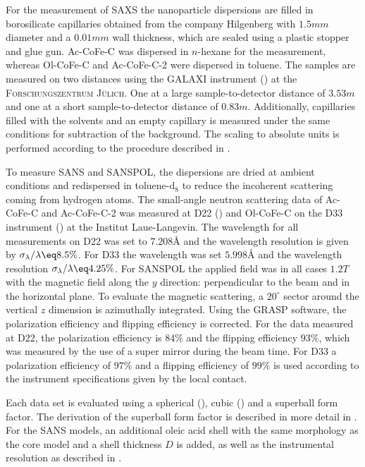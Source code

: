 \documentclass[\main/dresen_thesis.tex]{subfiles}
\begin{document}
    For the measurement of SAXS the nanoparticle dispersions are filled in borosilicate capillaries obtained from the company Hilgenberg with $1.5 \unit{mm}$ diameter and a $0.01 \unit{mm}$ wall thickness, which are sealed using a plastic stopper and glue gun.
    Ac-CoFe-C was dispersed in $\mathit{n}$-hexane for the measurement, whereas Ol-CoFe-C and Ac-CoFe-C-2 were dispersed in toluene.
    The samples are measured on two distances using the GALAXI instrument () at the \textsc{Forschungszentrum J\"ulich}.
    One at a large sample-to-detector distance of $3.53 \unit{m}$ and one at a short sample-to-detector distance of $0.83 \unit{m}$.
    Additionally, capillaries filled with the solvents and an empty capillary is measured under the same conditions for subtraction of the background.
    The scaling to absolute units is performed according to the procedure described in .

    To measure SANS and SANSPOL, the dispersions are dried at ambient conditions and redispersed in toluene-$\mathrm{d_8}$ to reduce the incoherent scattering coming from hydrogen atoms.
    The small-angle neutron scattering data of Ac-CoFe-C and Ac-CoFe-C-2 was measured at D22 () and Ol-CoFe-C on the D33 instrument () at the Institut Laue-Langevin.
    The wavelength for all measurements on D22 was set to $7.208 \unit{\angstrom}$ and the wavelength resolution is given by $\sigma_\lambda / \lambda \eq 8.5 \%$.
    For D33 the wavelength was set $5.998 \unit{\angstrom}$ and the wavelength resolution $\sigma_\lambda / \lambda \eq 4.25 \%$.
    For SANSPOL the applied field was in all cases $1.2 \unit{T}$ with the magnetic field along the $y$ direction: perpendicular to the beam and in the horizontal plane.
    To evaluate the magnetic scattering, a $20^\circ$ sector around the vertical $z$ dimension is azimuthally integrated.
    Using the GRASP software, the polarization efficiency and flipping efficiency is corrected.
    For the data measured at D22, the polarization efficiency is $84 \%$ and the flipping efficiency $93 \%$, which was measured by the use of a super mirror during the beam time.
    For D33 a polarization efficiency of $97 \%$ and a flipping efficiency of $99 \%$ is used according to the instrument specifications given by the local contact.

    Each data set is evaluated using a spherical (), cubic () and a superball form factor.
    The derivation of the superball form factor is described in more detail in .
    For the SANS models, an additional oleic acid shell with the same morphology as the core model and a shell thickness $D$ is added, as well as the instrumental resolution as described in .
\end{document}
